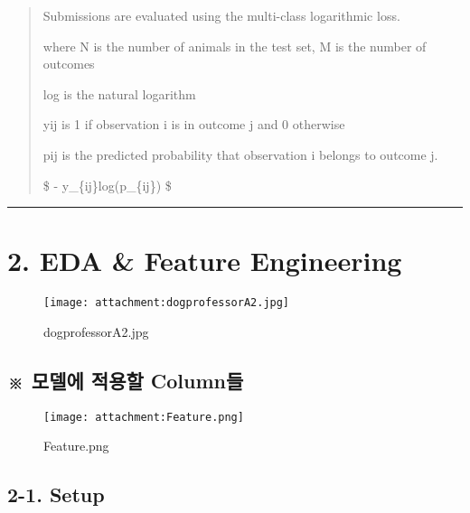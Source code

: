 \documentclass[11pt]{article}
\makeatletter
\def\maxwidth{\ifdim\Gin@nat@width>\linewidth\linewidth
    \else\Gin@nat@width\fi}
\let\Oldincludegraphics\includegraphics
\renewcommand{\includegraphics}[1]{\Oldincludegraphics[width=.8\maxwidth]{#1}}
\makeatother
\begin{document}
\begin{quote}
Submissions are evaluated using the multi-class logarithmic loss.

where N is the number of animals in the test set, M is the number of
outcomes

log is the natural logarithm

yij is 1 if observation i is in outcome j and 0 otherwise

pij is the predicted probability that observation i belongs to outcome
j.

\$ \Large - \sum \sum y\_\{ij\}log(p\_\{ij\}) \$
\end{quote}

    \begin{center}\rule{0.5\linewidth}{\linethickness}\end{center}

\section{2. EDA \& Feature Engineering}\label{eda-feature-engineering}

\begin{figure}
\centering
\texttt{[image: attachment:dogprofessorA2.jpg]}
\caption{dogprofessorA2.jpg}
\end{figure}

    \subsection{※ 모델에 적용할
Column들}\label{uxbaa8uxb378uxc5d0-uxc801uxc6a9uxd560-columnuxb4e4}

\begin{figure}
\centering
\texttt{[image: attachment:Feature.png]}
\caption{Feature.png}
\end{figure}

    \subsection{2-1. Setup}\label{setup}
\end{document}
